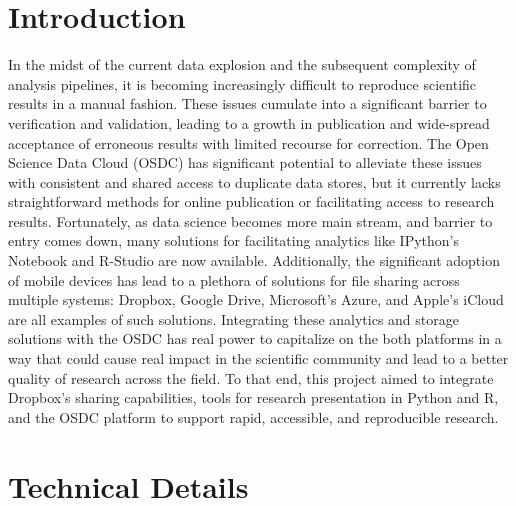 \documentclass[10pt,a4]{article}
\begin{document}
\maketitle

\section{Introduction}
In the midst of the current data explosion and the subsequent complexity of analysis pipelines, it is becoming increasingly difficult to reproduce scientific results in a manual fashion.
These issues cumulate into a significant barrier to verification and validation, leading to a growth in publication and wide-spread acceptance of erroneous results with limited recourse for correction.
The Open Science Data Cloud (OSDC) has significant potential to alleviate these issues with consistent and shared access to duplicate data stores, but it currently lacks straightforward methods for online publication or facilitating access to research results.
Fortunately, as data science becomes more main stream, and barrier to entry comes down, many solutions for facilitating analytics like IPython's Notebook and R-Studio are now available.
Additionally, the significant adoption of mobile devices has lead to a plethora of solutions for file sharing across multiple systems: Dropbox, Google Drive, Microsoft's Azure, and Apple's iCloud are all examples of such solutions.
Integrating these analytics and storage solutions with the OSDC has real power to capitalize on the  both platforms in a way that could cause real impact in the scientific community and lead to a better quality of research across the field.
To that end, this project aimed to integrate Dropbox's sharing capabilities, tools for research presentation in Python and R, and the OSDC platform to support rapid, accessible, and reproducible research.

\section{Technical Details}
\end{document}

